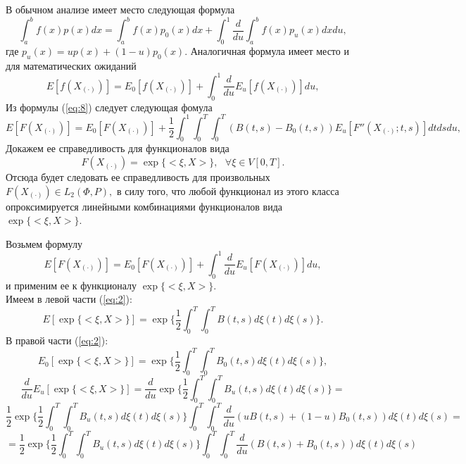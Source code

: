 \documentclass [a4paper, 12pt]{report}
\begin{document}
В обычном анализе имеет место следующая формула
\begin{equation}\label{eq:7}
\int_a^b{f(x)p(x)dx} = \int_a^b{f(x)p_0(x)dx} + \int_0^1{\frac{d}{du}}\int_a^b{f(x)p_u(x)dx du},
\end{equation}
где $p_u(x) = up(x) + (1 - u)p_0(x).$ Аналогичная формула имеет место и для математических ожиданий
\begin{equation}\label{eq:8}
E[f(X_{(\cdot)})] = E_0[f(X_{(\cdot)})] + \int_0^1{\frac{d}{du} E_u[f(X_{(\cdot)})] du},
\end{equation}
Из формулы (\ref{eq:8}) следует следующая фомула
\begin{equation}
E[F(X_{(\cdot)})] = E_0[F(X_{(\cdot)})] +
\frac{1}{2}\int_{0}^{1}\int_{0}^{T}\int_{0}^{T}(B(t,s)-B_0(t,s))
E_u[F''(X_{(\cdot)};t,s)]dtdsdu,
\label{eq:1}
\end{equation}
Докажем ее справедливость для функционалов вида
$$
F(X_{(\cdot)}) = \exp\{<\xi,X>\},~~~ \forall \xi \in V[0, T].
$$
Отсюда будет следовать ее справедливость для произвольных
$ F(X_{(\cdot)}) \in L_2(\Phi, P),$ в силу того, что любой функционал
из этого класса опроксимируется линейными комбинациями функционалов вида
$\exp\{<\xi,X>\}.$

Возьмем формулу
\begin{equation}
E[F(X_{(\cdot)})] = E_0[F(X_{(\cdot)})] + \int_{0}^{1}\frac{d}{du}
E_u[F(X_{(\cdot)})]du,
\label{eq:2}
\end{equation}
и применим ее к функционалу $\exp\{<\xi,X>\}.$\\
Имеем в левой части (\ref{eq:2}):
$$
E[\exp\{<\xi,X>\}] = \exp\{
\frac{1}{2}\int_{0}^{T}\int_{0}^{T}B(t,s)d\xi(t)d\xi(s)
\}.
$$
В правой части (\ref{eq:2}):
$$
E_0[\exp\{<\xi,X>\}] = \exp\{
\frac{1}{2}\int_{0}^{T}\int_{0}^{T}B_0(t,s)d\xi(t)d\xi(s)\},
$$
$$
\frac{d}{du}E_u[\exp\{<\xi,X>\}]=\frac{d}{du}\exp\{
\frac{1}{2}\int_{0}^{T}\int_{0}^{T}B_u(t,s)d\xi(t)d\xi(s)\} =
$$
$$
\frac{1}{2}\exp\{
\frac{1}{2}\int_{0}^{T}\int_{0}^{T}B_u(t,s)d\xi(t)d\xi(s)\}
\int_{0}^{T}\int_{0}^{T}\frac{d}{du}
(uB(t,s) + (1-u)B_0(t,s)) d\xi(t)d\xi(s) =
$$
$$
= \frac{1}{2}\exp\{
\frac{1}{2}\int_{0}^{T}\int_{0}^{T}B_u(t,s)d\xi(t)d\xi(s)\}
\int_{0}^{T}\int_{0}^{T}\frac{d}{du}(B(t,s)+B_0(t,s))d\xi(t)d\xi(s)
$$
\end{document}

